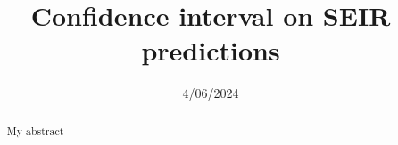 \documentclass{article}
\title{Confidence interval on SEIR predictions}
\author{}
\date{4/06/2024}
\begin{document}
\maketitle


\begin{abstract}

    My abstract 

\end{abstract}








\printbibliography
\end{document}
